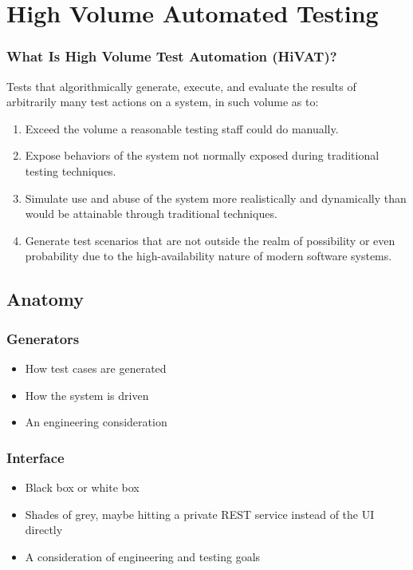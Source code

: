\section{High Volume Automated Testing}

\begin{frame}
  \frametitle{What Is High Volume Test Automation (HiVAT)?}
  Tests that algorithmically generate, execute, and evaluate the results of arbitrarily many test actions on a system, in such volume as to:\citep{KanerHivatOverview}
  \begin{enumerate}
  \item Exceed the volume a reasonable testing staff could do manually.
  \item Expose behaviors of the system not normally exposed during traditional testing techniques.
  \item Simulate use and abuse of the system more realistically and dynamically than would be attainable through traditional techniques.
  \item Generate test scenarios that are not outside the realm of possibility or even probability due to the high-availability nature of modern software systems.
\end{enumerate}
\end{frame}

\subsection{Anatomy}

\begin{frame}
  \frametitle{Generators}
  \begin{itemize}
    \item How test cases are generated
    \item How the system is driven
    \item An engineering consideration
  \end{itemize}
\end{frame}

\begin{frame}
  \frametitle{Interface}
  \begin{itemize}
    \item Black box or white box
    \item Shades of grey, maybe hitting a private REST service instead of the UI directly
    \item A consideration of engineering and testing goals
  \end{itemize}
  \citep{HoffmanTradeoffs}
\end{frame}

